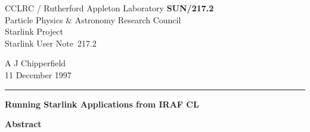\documentclass[twoside,11pt]{article}
\newcommand{\stardoccategory}  {Starlink User Note}
\newcommand{\stardocinitials}  {SUN}
\newcommand{\stardocnumber}    {217.2}
\newcommand{\stardocauthors}   {A J Chipperfield}
\newcommand{\stardocdate}      {11 December 1997}
\newcommand{\stardoctitle}     {Running Starlink Applications from IRAF CL}
\newcommand{\stardocversion}   {}
\newcommand{\stardocmanual}    {}
\newcommand{\stardocname}{\stardocinitials /\stardocnumber}
\newenvironment{latexonly}{}{}
\begin{document}
\thispagestyle{empty}

\begin{latexonly}
   CCLRC / {\sc Rutherford Appleton Laboratory} \hfill {\bfseries \stardocname}\\
   {\large Particle Physics \& Astronomy Research Council}\\
   {\large Starlink Project\\}
   {\large \stardoccategory\ \stardocnumber}
   \begin{flushright}
   \stardocauthors\\
   \stardocdate
   \end{flushright}
   \vspace{-4mm}
   \rule{\textwidth}{0.5mm}
   \vspace{5mm}
   \begin{center}
   {\Huge\bfseries  \stardoctitle \\ [2.5ex]}
   {\Huge\bfseries  \stardocmanual}
   \end{center}
   \vspace{5mm}

   \vspace{10mm}
   \begin{center}
      {\Large\bfseries Abstract}
   \end{center}
\end{latexonly}
\end{document}
